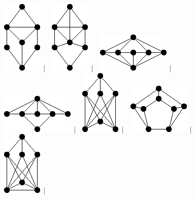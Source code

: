 \documentclass[11pt,paper=b5,footinclude,headinclude]{scrbook} %
\newtheorem{ex}{Vaja\hypertarget{sol:\theex}}[chapter]
\begin{document}
\begin{ex}
\begin{figure}
\includegraphics[scale=0.5]{smallGraphs/g_X104.png}$\,\mid\,$\
\includegraphics[scale=0.5]{smallGraphs/g_X105.png}$\,\mid\,$\
\includegraphics[scale=0.5]{smallGraphs/g_X106.png}$\,\mid\,$\
\includegraphics[scale=0.5]{smallGraphs/g_X107.png}$\,\mid\,$\
\includegraphics[scale=0.5]{smallGraphs/g_X11.png}$\,\mid\,$\
\includegraphics[scale=0.5]{smallGraphs/g_X111.png}$\,\mid\,$\
\includegraphics[scale=0.5]{smallGraphs/g_X12.png}$\,\mid\,$\

\end{figure}
\end{ex}
\end{document}

